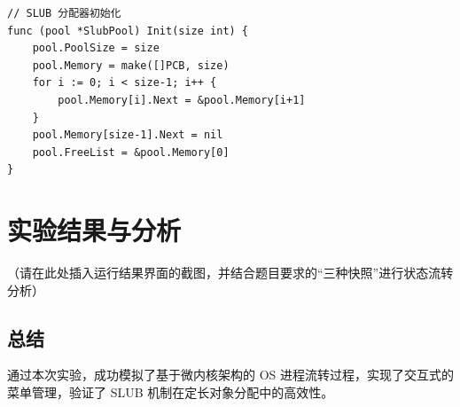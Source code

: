 \documentclass[a4paper,12pt]{ctexart}
\begin{document}
\begin{lstlisting}
// SLUB 分配器初始化
func (pool *SlubPool) Init(size int) {
    pool.PoolSize = size
    pool.Memory = make([]PCB, size)
    for i := 0; i < size-1; i++ {
        pool.Memory[i].Next = &pool.Memory[i+1]
    }
    pool.Memory[size-1].Next = nil
    pool.FreeList = &pool.Memory[0]
}
\end{lstlisting}

\section{实验结果与分析}
（请在此处插入运行结果界面的截图，并结合题目要求的“三种快照”进行状态流转分析）

\subsection{总结}
通过本次实验，成功模拟了基于微内核架构的 OS 进程流转过程，实现了交互式的菜单管理，验证了 SLUB 机制在定长对象分配中的高效性。
\end{document}
